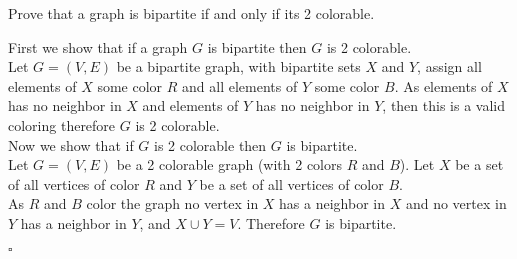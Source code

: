 \documentclass{exam}
\begin{document}
\begin{questions}

    \question Prove that a graph is bipartite if and only if its 2 colorable.
    \begin{solution}
        First we show that if a graph $G$ is bipartite then $G$ is 2 colorable.
        \\Let $G = (V,E)$ be a bipartite graph, with bipartite sets $X$ and $Y$, assign all elements of $X$ some color $R$ and all elements of $Y$ some color $B$.
        As elements of $X$ has no neighbor in $X$ and elements of $Y$ has no neighbor in $Y$, then this is a valid coloring therefore $G$ is 2 colorable.
        \\Now we show that if $G$ is 2 colorable then $G$ is bipartite.
        \\Let $G = (V,E)$ be a 2 colorable graph (with 2 colors $R$ and $B$). Let $X$ be a set of all vertices of color $R$ and $Y$ be a set of all vertices of color $B$.
        \\As $R$ and $B$ color the graph no vertex in $X$ has a neighbor in $X$ and no vertex in $Y$ has a neighbor in $Y$, and $X \cup Y = V$. Therefore $G$ is bipartite.
        \begin{flushright}
            $\square$
        \end{flushright} 
    \end{solution}

\end{questions}
\end{document}
